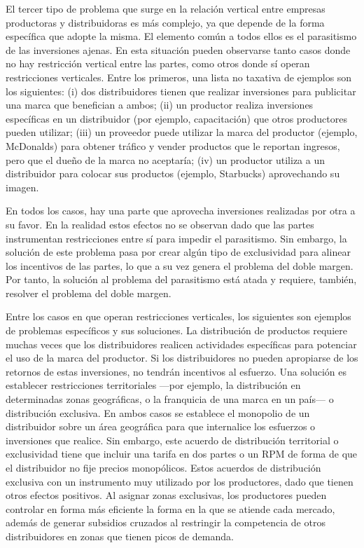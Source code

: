 \documentclass[
  12pt,
  spanish,
]{book}
\begin{document}
El tercer tipo de problema que surge en la relación vertical entre
empresas productoras y distribuidoras es más complejo, ya que depende de
la forma específica que adopte la misma. El elemento común a todos ellos
es el parasitismo de las inversiones ajenas. En esta situación pueden
observarse tanto casos donde no hay restricción vertical entre las
partes, como otros donde sí operan restricciones verticales. Entre los
primeros, una lista no taxativa de ejemplos son los siguientes: (i) dos
distribuidores tienen que realizar inversiones para publicitar una marca
que benefician a ambos; (ii) un productor realiza inversiones
específicas en un distribuidor (por ejemplo, capacitación) que otros
productores pueden utilizar; (iii) un proveedor puede utilizar la marca
del productor (ejemplo, McDonalds) para obtener tráfico y vender
productos que le reportan ingresos, pero que el dueño de la marca no
aceptaría; (iv) un productor utiliza a un distribuidor para colocar sus
productos (ejemplo, Starbucks) aprovechando su imagen.

En todos los casos, hay una parte que aprovecha inversiones realizadas
por otra a su favor. En la realidad estos efectos no se observan dado
que las partes instrumentan restricciones entre sí para impedir el
parasitismo. Sin embargo, la solución de este problema pasa por crear
algún tipo de exclusividad para alinear los incentivos de las partes, lo
que a su vez genera el problema del doble margen. Por tanto, la solución
al problema del parasitismo está atada y requiere, también, resolver el
problema del doble margen.

Entre los casos en que operan restricciones verticales, los siguientes
son ejemplos de problemas específicos y sus soluciones. La distribución
de productos requiere muchas veces que los distribuidores realicen
actividades específicas para potenciar el uso de la marca del productor.
Si los distribuidores no pueden apropiarse de los retornos de estas
inversiones, no tendrán incentivos al esfuerzo. Una solución es
establecer restricciones territoriales ---por ejemplo, la distribución
en determinadas zonas geográficas, o la franquicia de una marca en un
país--- o distribución exclusiva. En ambos casos se establece el
monopolio de un distribuidor sobre un área geográfica para que
internalice los esfuerzos o inversiones que realice. Sin embargo, este
acuerdo de distribución territorial o exclusividad tiene que incluir una
tarifa en dos partes o un RPM de forma de que el distribuidor no fije
precios monopólicos. Estos acuerdos de distribución exclusiva con un
instrumento muy utilizado por los productores, dado que tienen otros
efectos positivos. Al asignar zonas exclusivas, los productores pueden
controlar en forma más eficiente la forma en la que se atiende cada
mercado, además de generar subsidios cruzados al restringir la
competencia de otros distribuidores en zonas que tienen picos de
demanda.
\end{document}
